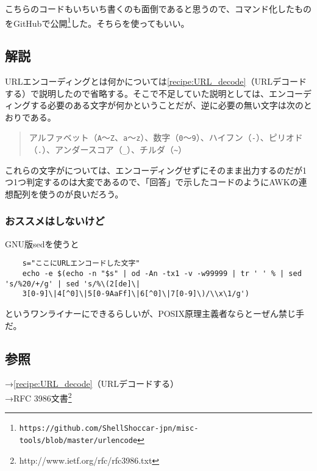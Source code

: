 こちらのコードもいちいち書くのも面倒であると思うので、コマンド化したものをGitHubで公開\footnote{\verb|https://github.com/ShellShoccar-jpn/misc-tools/blob/master/urlencode|}した。そちらを使ってもいい。


\subsection*{解説}
URLエンコーディングとは何かについては\ref{recipe:URL_decode}（URLデコードする）で説明したので省略する。そこで不足していた説明としては、エンコーディングする必要のある文字が何かということだが、逆に必要の無い文字は次のとおりである。

\begin{quote}
  アルファベット（\verb|A|～\verb|Z|、\verb|a|～\verb|z|）、数字（\verb|0|～\verb|9|）、ハイフン（\verb|-|）、ピリオド（\verb|.|）、アンダースコア（\verb|_|）、チルダ（\verb|~|）
\end{quote}

これらの文字がについては、エンコーディングせずにそのまま出力するのだが1つ1つ判定するのは大変であるので、「回答」で示したコードのようにAWKの連想配列を使うのが良いだろう。

\subsubsection*{おススメはしないけど}

GNU版sedを使うと\\
\begin{frameboxit}{160.0mm}
\begin{verbatim}
	s="ここにURLエンコードした文字"
	echo -e $(echo -n "$s" | od -An -tx1 -v -w99999 | tr ' ' % | sed 's/%20/+/g' | sed 's/%\(2[de]\|
	3[0-9]\|4[^0]\|5[0-9AaFf]\|6[^0]\|7[0-9]\)/\\x\1/g')
\end{verbatim}
\end{frameboxit}
というワンライナーにできるらしいが、POSIX原理主義者ならとーぜん禁じ手だ。

\subsection*{参照}

\noindent
→\ref{recipe:URL_decode}（URLデコードする）\\
→RFC 3986文書\footnote{http://www.ietf.org/rfc/rfc3986.txt}
